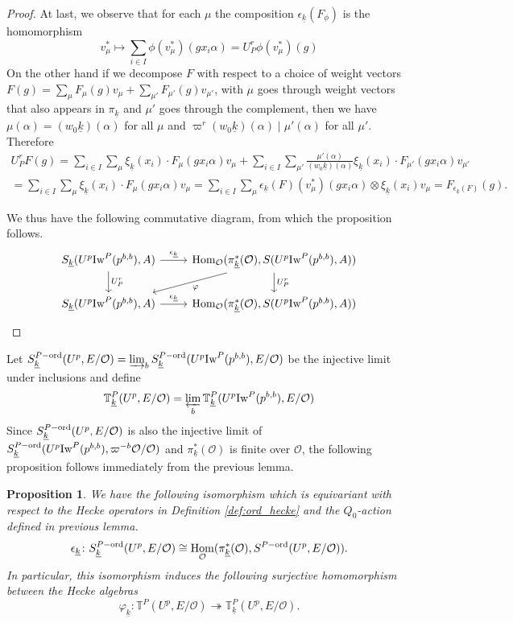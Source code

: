 \documentclass[leqno]{amsart}
\newtheorem{prop}[thm]{Proposition}
\theoremstyle{definition}
\theoremstyle{remark}
\newcommand{\oo}{\mathcal{O}}
\DeclareMathOperator{\Hom}{Hom}
\newcommand{\wt}[1]{\underline{ #1 }}
\newcommand{\Iw}{\textnormal{Iw}} %
\newcommand{\TT}{\mathbb{T}} %
\newcommand{\ord}{\textnormal{ord}} %
\begin{document}
\begin{proof}
	At last, we observe that for each $\mu$ 
	the composition
	$\epsilon_{\wt{k}}(F_\phi)$ is the homomorphism
	\[
		v_\mu^*\mapsto \sum_{i\in I}\phi(v_\mu^*)
		(gx_i\alpha) =U_P^r\phi(v_\mu^*)(g)
	\]
	On the other hand 
	if we decompose $F$ with respect to a choice of 
	weight vectors
	$F(g)=\sum_\mu F_\mu(g)v_\mu+
	\sum_{\mu'}F_{\mu'}(g)v_{\mu'}$, 
	with $\mu$ goes through weight vectors 
	that also appears in $\pi_{\wt{k}}$
	and $\mu'$ goes through the complement,
	then we have
	$\mu(\alpha)=(w_0\wt{k})(\alpha)$ for all $\mu$
	and  $\varpi^r(w_0\wt{k})(\alpha)\mid \mu'(\alpha)$
	for all $\mu'$.
	Therefore
	\begin{multline*}
	U_P^rF(g)=
	\sum_{i\in I}
	\sum_\mu \xi_{\wt{k}}(x_i)\cdot F_\mu(gx_i\alpha)v_\mu+
	\sum_{i\in I}
	\sum_{\mu'}\frac{\mu'(\alpha)}{(w_0\wt{k})(\alpha)}
	\xi_{\wt{k}}(x_i)\cdot F_{\mu'}(gx_i\alpha)v_{\mu'}\\=
	\sum_{i\in I}
	\sum_\mu \xi_{\wt{k}}(x_i)\cdot F_\mu(gx_i\alpha)v_\mu=
	\sum_{i\in I}
	\sum_\mu 
	\epsilon_{\wt{k}}(F)(v^*_\mu)(gx_i\alpha)\otimes
    \xi_{\wt{k}}(x_i)v_\mu
	=F_{\epsilon_{\wt{k}}(F)}(g).
	\end{multline*}

	We thus have the following commutative diagram,
	from which the proposition follows.
	\[
	\begin{tikzcd}
		S_{\wt{k}}(U^p\Iw^P(p^{b,b}),A)
		\arrow[r,"\epsilon_{\wt{k}}"]
		\arrow[d,"U_P^r"]
		& \Hom_\oo(\pi^*_{\wt{k}}(\oo), S(U^p\Iw^P(p^{b,b}),A))
		\arrow[d,"U_P^r"]
		\arrow[dl,"\varphi"]\\
		S_{\wt{k}}(U^p\Iw^P(p^{b,b}),A)
		\arrow[r,"\epsilon_{\wt{k}}"]
		& \Hom_\oo(\pi^*_{\wt{k}}(\oo), S(U^p\Iw^P(p^{b,b}),A))
	\end{tikzcd}	
	\]
\end{proof}


Let $S_{\wt{k}}^{P-\ord}(U^p,E/\oo)=
\varinjlim_{b}
S_{\wt{k}}^{P-\ord}(U^p\Iw^P(p^{b,b}),E/\oo)$
be the injective limit under inclusions
and define 
\[
	\TT^P_{\wt{k}}(U^p,E/\oo)=
	\varprojlim_{b}
	\TT^P_{\wt{k}}(U^p\Iw^P(p^{b,b}),E/\oo)
\]
Since $S_{\wt{k}}^{P-\ord}(U^p,E/\oo)$
is also the injective limit of 
$S_{\wt{k}}^{P-\ord}(U^p\Iw^P(p^{b,b}),\varpi^{-b}\oo/\oo)$
and $\pi_{\wt{k}}^*(\oo)$ is finite over $\oo$,
the following proposition
follows immediately from the previous lemma.

\begin{prop}\label{prop:wt_indep}
	We have the following isomorphism
	which is equivariant with respect to the 
	Hecke operators in Definition \ref{def:ord_hecke}
    and the $Q_0$-action  defined in previous lemma.
	\[
		\epsilon_{\wt{k}} \colon 
		S_{\wt{k}}^{P-\ord}(U^p,E/\oo)\cong 
		\Hom_{\oo}(\pi_{\wt{k}}^*(\oo),
		S^{P-\ord}(U^p,E/\oo)).
	\]
	In particular, this isomorphism 
	induces the following surjective homomorphism
	between the Hecke algebras
	\[
		\varphi_{\wt{k}}\colon 
		\TT^P(U^p,E/\oo)\twoheadrightarrow
		\TT^P_{\wt{k}}(U^p,E/\oo).
	\]
\end{prop}
\end{document}
